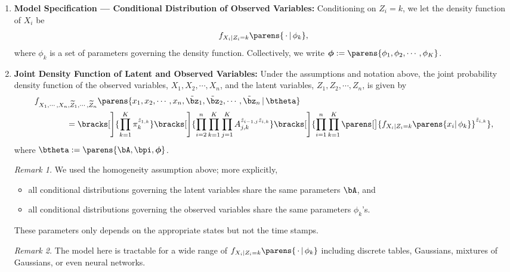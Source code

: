 \documentclass[12pt]{article}
\begin{document}
\begin{enumerate}[label=\textbf{\arabic*.}]
	\item \textbf{Model Specification --- Conditional Distribution of Observed Variables:} Conditioning on $Z_i = k$, we let the density function of $X_i$ be 
	\begin{align*}
		f_{X_i \vert Z_i = k} \parens{\,\cdot\, \vert\, \phi_k}, 
	\end{align*}
	where $\phi_k$ is a set of parameters governing the density function. Collectively, we write $\boldsymbol{\phi} := \parens{\phi_1, \phi_2, \cdots, \phi_K}$. 
	
	\item \textbf{Joint Density Function of Latent and Observed Variables:} Under the assumptions and notation above, the joint probability density function of the observed variables, $X_1, X_2, \cdots, X_n$, and the latent variables, $Z_1, Z_2, \cdots, Z_n$, is given by 
	\begin{align}
		& \, f_{X_1, \cdots, X_n, \widetilde{Z}_1, \cdots, \widetilde{Z}_n} \parens{x_1, x_2, \cdots, x_n, \tilde{\bz}_1, \tilde{\bz}_2, \cdots, \tilde{\bz}_n \,\vert\, \btheta} \nonumber \\ 
		& \qquad \qquad  = \bracks[\Bigg]{\prod_{k=1}^K \pi_k^{\tilde{z}_{1,k}}} \bracks[\Bigg]{\prod_{i=2}^n \prod_{k=1}^K \prod_{j=1}^K A_{j,k}^{\tilde{z}_{i-1,j} \tilde{z}_{i,k}} } \bracks[\Bigg]{\prod_{i=1}^n \prod_{k=1}^K \parens[\big]{f_{X_i \vert Z_i = k} \parens{x_i \vert\, \phi_k}}^{\tilde{z}_{i,k}}}, \label{eq-joint-pdf}
	\end{align}
	where $\btheta := \parens{\bA, \bpi, \boldsymbol{\phi}}$. 
	
	\textit{Remark 1.} We used the homogeneity assumption above; more explicitly, 
	\begin{itemize}
		\item all conditional distributions governing the latent variables share the same parameters $\bA$, and 
		\item all conditional distributions governing the observed variables share the same parameters $\phi_k$'s. 
	\end{itemize}
	These parameters only depends on the appropriate states but not the time stamps. 
	
	\textit{Remark 2.} The model here is tractable for a wide range of $f_{X_i \vert Z_i = k} \parens{\,\cdot\, \vert\, \phi_k}$ including discrete tables, Gaussians, mixtures of Gaussians, or even neural networks. 
	

\end{enumerate}
\end{document}
